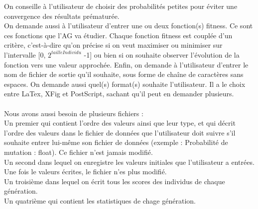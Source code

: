 \documentclass[a4paper,11pt]{article}
\begin{document}
		On conseille à l’utilisateur de choisir des probabilités petites pour éviter une convergence des résultats prématurée.\\
		On demande aussi à l’utilisateur d’entrer une ou deux fonction(s) fitness.
		Ce sont ces fonctions que l’AG va étudier.
		Chaque fonction fitness est couplée d’un critère, c’est-à-dire qu’on précise si on veut maximiser ou minimiser sur l’intervalle [0, $2^{tailleIndividu}$ -1] ou bien si on souhaite observer l’évolution de la fonction vers une valeur approchée.
		Enfin, on demande à l’utilisateur d’entrer le nom de fichier de sortie qu’il souhaite, sous forme de chaîne de caractères sans espaces.
		On demande aussi quel(s) format(s) souhaite l’utilisateur.
		Il a le choix entre LaTex, XFig et PostScript, sachant qu’il peut en demander plusieurs.\\
		\\
		Nous avons aussi besoin de plusieurs fichiers :\\

		Un premier qui contient l’ordre des valeurs ainsi que leur type, et qui décrit l'ordre des valeurs dans le fichier de données que l'utilisateur doit suivre s'il souhaite entrer lui-même son fichier de données (exemple : Probabilité de mutation : float). Ce fichier n'est jamais modifié.\\
		Un second dans lequel on enregistre les valeurs initiales que l'utilisateur a entrées. Une fois le valeurs écrites, le fichier n'es plus modifié.\\
		Un troisième dans lequel on écrit tous les scores des individus de chaque génération.\\
		Un quatrième qui contient les statistiques de chage génération.\\

		
\end{document}
